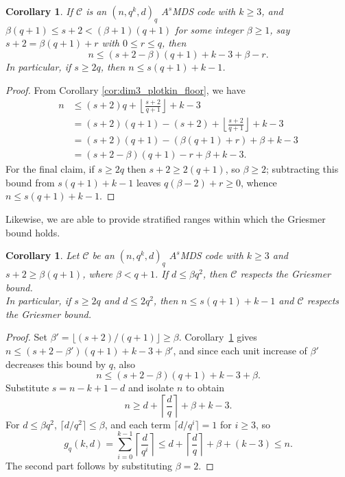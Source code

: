 \documentclass[12pt, letterpaper]{article}
\theoremstyle{plain}
\newtheorem{corollary}[theorem]{Corollary}
\theoremstyle{definition}
\newcommand{\mc}[1]{\mathcal{#1}}
\begin{document}
    \begin{corollary}\label{cor:large_defect_bound_stratified}
    	If $\mc{C}$ is an $(n, q^k, d)_q$ $A^s$MDS code with $k \ge 3$, and $\beta(q+1)\le s+2 <(\beta+1)(q+1)$ for some integer $\beta\ge 1$, say $s+2=\beta(q+1)+r$ with $0\le r\le q$, then
    	\[
    	n\le (s+2-\beta)(q+1)+k-3+\beta-r.
    	\]
    	In particular, if $s\ge 2q$, then $n\le s(q+1)+k-1$.
   \end{corollary}
	
	\begin{proof}
		From Corollary \ref{cor:dim3_plotkin_floor}, we have
		\begin{align*}
			n& \le (s+2)q + \left\lfloor\frac{s+2}{q+1}\right\rfloor + k - 3\\
			& = (s+2)(q+1) -(s+2) + \left\lfloor\frac{s+2}{q+1}\right\rfloor + k - 3\\
			& = (s+2)(q+1) -(\beta(q+1)+r)+\beta + k - 3\\
			& = (s+2-\beta)(q+1) -r +\beta + k - 3.
		\end{align*}
		For the final claim, if $s\ge 2q$ then $s+2\ge 2(q+1)$, so $\beta\ge 2$; subtracting this bound from $s(q+1)+k-1$ leaves $q(\beta-2)+r\ge 0$, whence $n\le s(q+1)+k-1$.
	\end{proof}


	Likewise, we are able to provide stratified ranges within which the Griesmer bound holds.

    \begin{corollary}\label{cor:large_defect_griesmer}
    	Let $\mathcal{C}$ be an $(n, q^k, d)_q$ $A^s$MDS code with $k \ge 3$ and $s+2 \ge \beta(q+1)$, where $\beta< q+1$. If  $d \le \beta q^2$, then $\mathcal{C}$ respects the Griesmer bound.\\
    	In particular, if $s\ge 2q$ and $d\le 2q^2$, then $n\le s(q+1)+k-1$ and $\mathcal{C}$ respects the Griesmer bound.
    \end{corollary}
    
    \begin{proof}
    	Set $\beta' = \lfloor (s+2)/(q+1) \rfloor \ge \beta$. Corollary~\ref{cor:large_defect_bound_stratified} gives $n \le (s+2-\beta')(q+1)+k-3+\beta'$, and since each unit increase of $\beta'$ decreases this bound by $q$, also
    	\[
    	n \le (s+2-\beta)(q+1)+k-3+\beta.
    	\]
    	Substitute $s = n-k+1-d$ and isolate $n$ to obtain
    	\[
    	n \ge d + \left\lceil\frac{d}{q}\right\rceil+ \beta + k - 3.
    	\]
    	For $d \le \beta q^2$, $\lceil d/q^2\rceil \le \beta$, and each term $\lceil d/q^i\rceil =1$ for $i \ge 3$, so
    	\[
    	g_q(k,d) = \sum_{i=0}^{k-1}\left\lceil\frac{d}{q^i}\right\rceil
    	\le d + \left\lceil\frac{d}{q}\right\rceil + \beta + (k-3)
    	 \le n.
    	\]
    	The second part follows by substituting $\beta=2$.
    	\qedhere
    \end{proof}
\end{document}
